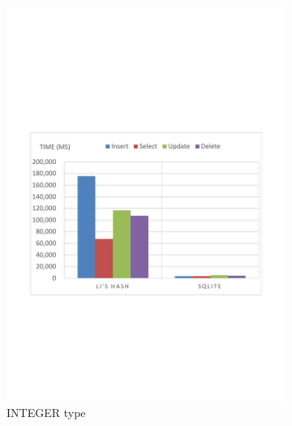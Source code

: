 \begin{figure}
        \begin{subfigure}[b]{0.4\textwidth}
                \includegraphics[width=\textwidth]{./performance/result/index-layer/image/100only/integer1.pdf}
                \caption{INTEGER type}
                \label{fig:performance:result:index-layer:insert:real}
        \end{subfigure}
        ~ %
        \begin{subfigure}[b]{0.4\textwidth}

\end{subfigure}
\end{figure}
